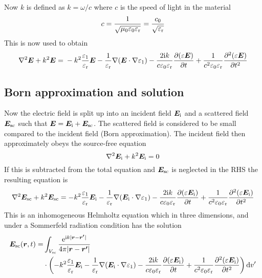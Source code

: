 \documentclass[11pt,twoside]{eitExjobb}
\begin{document}
	Now $k$ is defined as $k = \omega/c$ where $c$ is the speed of light in the material
	\begin{equation*}
		c = \frac{1}{\sqrt{\mu_0 \varepsilon_0 \varepsilon_{\mathrm{r}}}} = \frac{c_0}{\sqrt{\varepsilon_{\mathrm{r}}}}
	\end{equation*}
	This is now used to obtain
	\begin{equation*}
		\nabla^2\bm{E} + k^2 \bm{E} = \\
		-k^2 \frac{\varepsilon_1}{\varepsilon_{\mathrm{r}}} \bm{E} -\frac{1}{\varepsilon_{\mathrm{r}}}\nabla(\bm{E} \cdot \nabla \varepsilon_1) - \frac{2\mathrm{i} k}{c\varepsilon_0\varepsilon_{\mathrm{r}}} \frac{\partial (\varepsilon \bm{E})}{\partial t} + \frac{1}{c^2 \varepsilon_0 \varepsilon_{\mathrm{r}}} \frac{\partial^2 (\varepsilon \bm{E})}{\partial t^2}
	\end{equation*}
	
	\subsection{Born approximation and solution \label{sec:app-derivations-scatter-born}}
	Now the electric field is split up into an incident field $\bm{E}_{\mathrm{i}}$ and a scattered field $\bm{E}_{\mathrm{sc}}$ such that $\bm{E} = \bm{E}_{\mathrm{i}} + \bm{E}_{\mathrm{sc}}$. The scattered field is considered to be small compared to the incident field (Born approximation). The incident field then approximately obeys the source-free equation
	\begin{equation*}
		\nabla^2 \bm{E}_{\mathrm{i}} + k^2 \bm{E}_{\mathrm{i}} = 0
	\end{equation*}
	If this is subtracted from the total equation and $\bm{E}_{\mathrm{sc}}$ is neglected in the RHS the resulting equation is
	\begin{equation*}
		\nabla^2\bm{E}_{\mathrm{sc}} + k^2 \bm{E}_{\mathrm{sc}} =	-k^2 \frac{\varepsilon_1}{\varepsilon_{\mathrm{r}}} \bm{E}_{\mathrm{i}} -\frac{1}{\varepsilon_{\mathrm{r}}}\nabla(\bm{E}_{\mathrm{i}} \cdot \nabla \varepsilon_1) - \frac{2\mathrm{i} k}{c\varepsilon_0\varepsilon_{\mathrm{r}}} \frac{\partial (\varepsilon \bm{E}_{\mathrm{i}})}{\partial t} + \frac{1}{c^2 \varepsilon_0 \varepsilon_{\mathrm{r}}} \frac{\partial^2 (\varepsilon \bm{E}_{\mathrm{i}})}{\partial t^2}
	\end{equation*}
	This is an inhomogeneous Helmholtz equation which in three dimensions, and under a Sommerfeld radiation condition has the solution \addref
	\begin{equation*}
	\begin{split}
		\bm{E}_{\mathrm{sc}}(\bm{r},t) =& \int_{V_{\mathrm{sc}}} \frac{\mathrm{e}^{\mathrm{i} k |\bm{r}-\bm{r'}| }}{4\pi |\bm{r}-\bm{r'}|} \\
		&\cdot \left( -k^2 \frac{\varepsilon_1}{\varepsilon_{\mathrm{r}}} \bm{E}_{\mathrm{i}} -\frac{1}{\varepsilon_{\mathrm{r}}}\nabla(\bm{E}_{\mathrm{i}} \cdot \nabla \varepsilon_1)- \frac{2\mathrm{i} k}{c\varepsilon_0\varepsilon_{\mathrm{r}}} \frac{\partial (\varepsilon \bm{E}_{\mathrm{i}})}{\partial t} + \frac{1}{c^2 \varepsilon_0 \varepsilon_{\mathrm{r}}} \frac{\partial^2 (\varepsilon \bm{E}_{\mathrm{i}})}{\partial t^2} \right) \mathrm{d}v'
	\end{split}
	\end{equation*}
	
\end{document}
